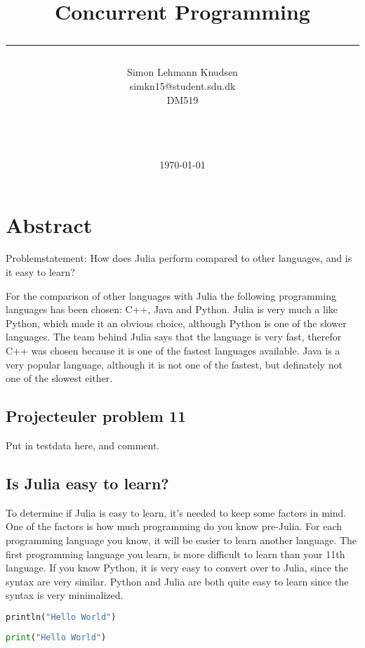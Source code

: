 \documentclass[a4paper,11pt]{article}
\title{Concurrent Programming\\\rule{10cm}{0.5mm}}
\author{Simon Lehmann Knudsen
\\simkn15@student.sdu.dk\\ DM519\\\rule{5.5cm}{0.5mm}\\}
\date{\today}
\begin{document}


\newpage
\section{Abstract}
Problemstatement:
How does Julia perform compared to other languages, and is it easy to learn?

For the comparison of other languages with Julia the following programming languages has been chosen: C++, Java and Python. Julia is very much a like Python, which made it an obvious choice, although Python is one of the slower languages. The team behind Julia says that the language is very fast, therefor C++ was chosen because it is one of the fastest languages available. Java is a very popular language, although it is not one of the fastest, but definately not one of the slowest either.

\subsection{Projecteuler problem 11}
Put in testdata here, and comment.

\subsection{Is Julia easy to learn?}
To determine if Julia is easy to learn, it's needed to keep some factors in mind. One of the factors is how much programming do you know pre-Julia. For each programming language you know, it will be easier to learn another language. The first programming language you learn, is more difficult to learn than your 11th language. If you know Python, it is very easy to convert over to Julia, since the syntax are very similar. Python and Julia are both quite easy to learn since the syntax is very minimalized.

\begin{lstlisting}[caption=Hello World in Julia, language=python]
println("Hello World")
\end{lstlisting}

\begin{lstlisting}[caption=Hello World in Python, language=python]
print("Hello World")
\end{lstlisting}
\end{document}
